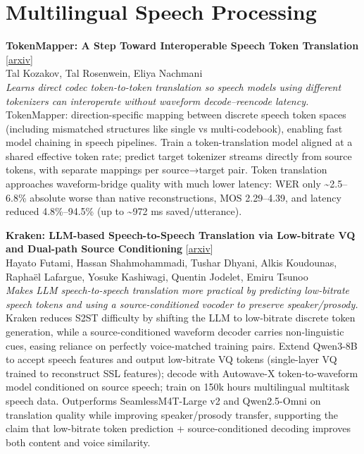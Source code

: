 \documentclass[12pt,letterpaper]{article}
\begin{document}
\medskip


\section*{Multilingual Speech Processing}

{\small\textbf{TokenMapper: A Step Toward Interoperable Speech Token Translation}} {\scriptsize[\href{https://arxiv.org/abs/2609.12563}{arxiv}]}\\
{\scriptsize Tal Kozakov, Tal Rosenwein, Eliya Nachmani}\\

{\small\textit{Learns direct codec token-to-token translation so speech models using different tokenizers can interoperate without waveform decode--reencode latency.}}\\[1pt]
{\footnotesize TokenMapper: direction-specific mapping between discrete speech token spaces (including mismatched structures like single vs multi-codebook), enabling fast model chaining in speech pipelines. Train a token-translation model aligned at a shared effective token rate; predict target tokenizer streams directly from source tokens, with separate mappings per source→target pair. Token translation approaches waveform-bridge quality with much lower latency: WER only \textasciitilde{}2.5--6.8\% absolute worse than native reconstructions, MOS 2.29--4.39, and latency reduced 4.8\%--94.5\% (up to \textasciitilde{}972 ms saved/utterance).}

\medskip

{\small\textbf{Kraken: LLM-based Speech-to-Speech Translation via Low-bitrate VQ and Dual-path Source Conditioning}} {\scriptsize[\href{https://arxiv.org/abs/2609.13045}{arxiv}]}\\
{\scriptsize Hayato Futami, Hassan Shahmohammadi, Tushar Dhyani, Alkis Koudounas, Rapha\"el Lafargue, Yosuke Kashiwagi, Quentin Jodelet, Emiru Tsunoo}\\

{\small\textit{Makes LLM speech-to-speech translation more practical by predicting low-bitrate speech tokens and using a source-conditioned vocoder to preserve speaker/prosody.}}\\[1pt]
{\footnotesize Kraken reduces S2ST difficulty by shifting the LLM to low-bitrate discrete token generation, while a source-conditioned waveform decoder carries non-linguistic cues, easing reliance on perfectly voice-matched training pairs. Extend Qwen3-8B to accept speech features and output low-bitrate VQ tokens (single-layer VQ trained to reconstruct SSL features); decode with Autowave-X token-to-waveform model conditioned on source speech; train on 150k hours multilingual multitask speech data. Outperforms SeamlessM4T-Large v2 and Qwen2.5-Omni on translation quality while improving speaker/prosody transfer, supporting the claim that low-bitrate token prediction + source-conditioned decoding improves both content and voice similarity.}
\end{document}
